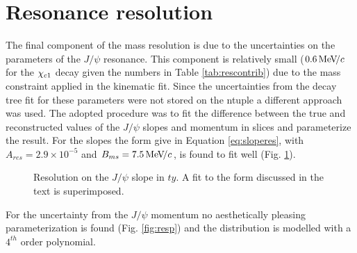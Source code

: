 \section{Resonance resolution}
\label{sec:res}
% 
The final component of the mass resolution is due to the uncertainties
on the parameters of the $J/\psi$ resonance. This component is
relatively small ($0.6 \text{\,Me\kern -0.1em V\!/}c$ for the ${\chi_{{c} 1}}$ decay given the
numbers in Table \ref{tab:rescontrib}) due to the mass constraint applied in the kinematic
fit. Since the uncertainties from the decay tree fit for these
parameters were not stored on the ntuple a different approach was
used. The adopted procedure was to fit the difference between the true and reconstructed values of the
$J/\psi$ slopes and momentum in slices and parameterize the
result. For the slopes the form give in Equation \ref{eq:sloperes}, with $A_{res} = 2.9 \times 10^{-5}$ and $B_{ms} =
7.5 \text{\,Me\kern -0.1em V\!/}c$, is found to fit well (Fig. \ref{fig:resty}).  
%
\begin{figure}[htb!]
\begin{center}
\caption{\small Resolution on the $J/\psi$ slope in $ty$. A fit to the
  form discussed in the text is superimposed.} 
\label{fig:resty}
\end{center}
\end{figure}

For the uncertainty from the $J/\psi$ momentum no aesthetically pleasing
parameterization is found (Fig. \ref{fig:resp}) and the distribution is
modelled with a $4^{th}$ order polynomial.


